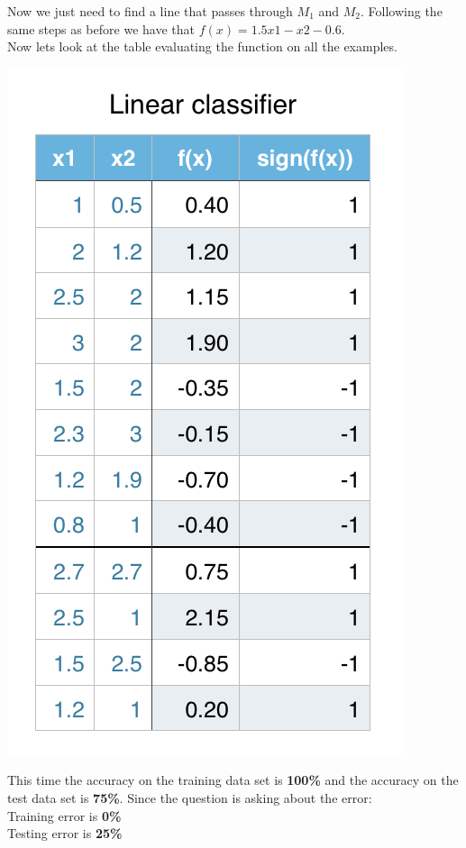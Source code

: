 \documentclass[11pt]{article}
\begin{document}
Now we just need to find a line that passes through $M_1$ and $M_2$. Following the same steps as before we have that $f(x) = 1.5x1 - x2 - 0.6$.\\

Now lets look at the table evaluating the function on all the examples.
\begin{center}
\includegraphics[scale=0.75]{linear2.png}
\end{center}

This time the accuracy on the training data set is \textbf{100\%} and the accuracy on the test data set is \textbf{75\%}. Since the question is asking about the error:\\
Training error is \textbf{0\%}\\
Testing error is \textbf{25\%}\\
\end{document}
